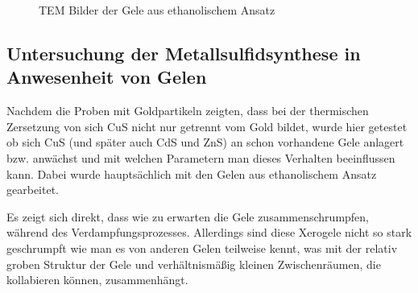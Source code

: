 		\begin{figure}[htbp]
			\centering
			\caption{TEM Bilder der Gele aus ethanolischem Ansatz}
			\label{fig:Gel-E}
		\end{figure}
	
	\subsection{Untersuchung der Metallsulfidsynthese in Anwesenheit von Gelen}
	
	Nachdem die Proben mit Goldpartikeln zeigten, dass bei der thermischen Zersetzung von  sich CuS nicht nur getrennt vom Gold bildet, wurde hier getestet ob sich CuS (und später auch CdS und ZnS) an schon vorhandene Gele anlagert bzw. anwächst und mit welchen Parametern man dieses Verhalten beeinflussen kann.
	Dabei wurde hauptsächlich mit den Gelen aus ethanolischem Ansatz gearbeitet.
	
	Es zeigt sich direkt, dass wie zu erwarten die Gele zusammenschrumpfen, während des Verdampfungsprozesses.
	Allerdings sind diese Xerogele nicht so stark geschrumpft wie man es von anderen Gelen teilweise kennt, was mit der relativ groben Struktur der Gele und verhältnismäßig kleinen Zwischenräumen, die kollabieren können, zusammenhängt.
	
